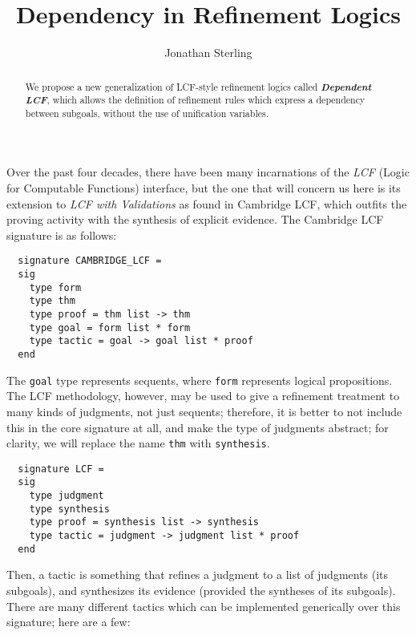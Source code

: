 \documentclass[11pt]{article}
\theoremstyle{definition}
\theoremstyle{remark}
\numberwithin{equation}{section}
\newcommand\DepLCF{\textbf{\emph{Dependent LCF}}}
\begin{document}
\title{Dependency in Refinement Logics}
\date{}
\author{Jonathan Sterling}
\maketitle

\begin{abstract}

  We propose a new generalization of LCF-style refinement logics called \DepLCF,
  which allows the definition of refinement rules which express a dependency
  between subgoals, without the use of unification variables.

\end{abstract}

Over the past four decades, there have been many incarnations of the \emph{LCF}
(Logic for Computable Functions) interface, but the one that will concern us
here is its extension to \emph{LCF with Validations} as found in Cambridge LCF,
which outfits the proving activity with the synthesis of explicit evidence.
The Cambridge LCF signature is as follows:


\begin{lstlisting}
  signature CAMBRIDGE_LCF =
  sig
    type form
    type thm
    type proof = thm list -> thm
    type goal = form list * form
    type tactic = goal -> goal list * proof
  end
\end{lstlisting}

The \verb!goal! type represents sequents, where \verb!form! represents logical
propositions. The LCF methodology, however, may be used to give a refinement
treatment to many kinds of judgments, not just sequents; therefore, it
is better to not include this in the core signature at all, and make the
type of judgments abstract; for clarity, we will replace the name \verb!thm!
with \verb!synthesis!.

\begin{lstlisting}
  signature LCF =
  sig
    type judgment
    type synthesis
    type proof = synthesis list -> synthesis
    type tactic = judgment -> judgment list * proof
  end
\end{lstlisting}

Then, a tactic is something that refines a judgment to a list of judgments (its
subgoals), and synthesizes its evidence (provided the syntheses of its
subgoals). There are many different tactics which can be implemented
generically over this signature; here are a few:
\end{document}
